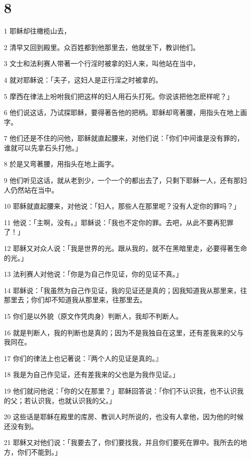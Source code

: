 \chapter{8}

\par 1 耶稣却往橄榄山去，
\par 2 清早又回到殿里。众百姓都到他那里去，他就坐下，教训他们。
\par 3 文士和法利赛人带著一个行淫时被拿的妇人来，叫他站在当中，
\par 4 就对耶稣说：「夫子，这妇人是正行淫之时被拿的。
\par 5 摩西在律法上吩咐我们把这样的妇人用石头打死。你说该把他怎麽样呢？」
\par 6 他们说这话，乃试探耶稣，要得著告他的把柄。耶稣却弯著腰，用指头在地上画字。
\par 7 他们还是不住的问他，耶稣就直起腰来，对他们说：「你们中间谁是没有罪的，谁就可以先拿石头打他。」
\par 8 於是又弯著腰，用指头在地上画字。
\par 9 他们听见这话，就从老到少，一个一个的都出去了，只剩下耶稣一人，还有那妇人仍然站在当中。
\par 10 耶稣就直起腰来，对他说：「妇人，那些人在那里呢？没有人定你的罪吗？」
\par 11 他说：「主啊，没有。」耶稣说：「我也不定你的罪。去吧，从此不要再犯罪了！」
\par 12 耶稣又对众人说：「我是世界的光。跟从我的，就不在黑暗里走，必要得著生命的光。」
\par 13 法利赛人对他说：「你是为自己作见证，你的见证不真。」
\par 14 耶稣说：「我虽然为自己作见证，我的见证还是真的；因我知道我从那里来，往那里去；你们却不知道我从那里来，往那里去。
\par 15 你们是以外貌（原文作凭肉身）判断人，我却不判断人。
\par 16 就是判断人，我的判断也是真的；因为不是我独自在这里，还有差我来的父与我同在。
\par 17 你们的律法上也记著说：『两个人的见证是真的。』
\par 18 我是为自己作见证，还有差我来的父也是为我作见证。」
\par 19 他们就问他说：「你的父在那里？」耶稣回答说：「你们不认识我，也不认识我的父；若认识我，也就认识我的父。」
\par 20 这些话是耶稣在殿里的库房、教训人时所说的，也没有人拿他，因为他的时候还没有到。
\par 21 耶稣又对他们说：「我要去了，你们要找我，并且你们要死在罪中。我所去的地方，你们不能到。」
